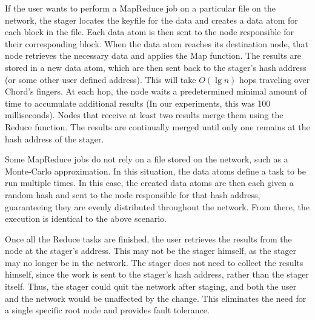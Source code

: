 If the user wants to perform a MapReduce job on a particular file on the network, the stager locates the keyfile for the data and creates a data atom for each block in the file.  
Each data atom is then sent to the node responsible for their corresponding block.  
When the data atom reaches its destination node, that node retrieves the necessary data and applies the Map function.  
The results are stored in a new data atom,  which are then sent back to the stager's hash address (or some other user defined address).  
This will take $O(\lg n)$ hops traveling over Chord's fingers.  
At each hop, the node waits a predetermined minimal amount of time to accumulate additional results (In our experiments, this was 100 milliseconds).  
Nodes that receive at least two results merge them using the Reduce function.  
The results are continually merged until only one remains at the hash address of the stager. 


Some MapReduce jobs do not rely on a file stored on the network, such as a Monte-Carlo approximation.
In this situation, the data atoms define a task to be run multiple times.
In this case, the created data atoms are then each given a random hash and sent to the node responsible for that hash address, guaranteeing they are evenly distributed throughout the network. 
From there, the execution is identical to the above scenario.



Once all the Reduce tasks are finished, the user retrieves the results from the node at the stager's address.  
This may not be the stager himself, as the stager may no longer be in the network.  
The stager does not need to collect the results himself, since the work is sent to the stager's hash address, rather than the stager itself.  
Thus, the stager could quit the network after staging, and both the user and the network would be unaffected by the change. 
This eliminates the need for a single specific root node and provides fault tolerance.

